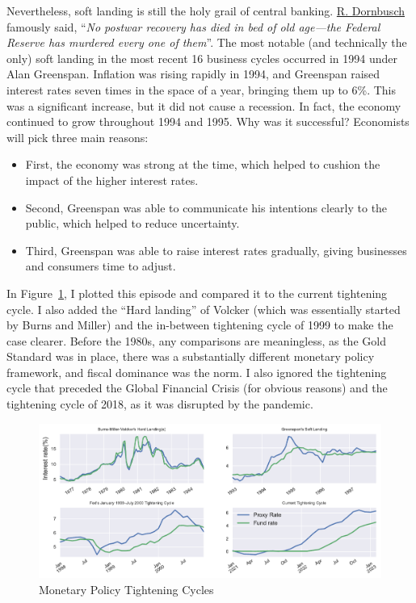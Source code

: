 \documentclass[
  letterpaper,
  DIV=11,
  numbers=noendperiod]{scrartcl}
\providecommand{\tightlist}{%
  \setlength{\itemsep}{0pt}\setlength{\parskip}{0pt}}\usepackage{longtable,booktabs,array}
\begin{document}
Nevertheless, soft landing is still the holy grail of central banking.
\href{https://en.wikipedia.org/wiki/Rudi_Dornbusch}{R. Dornbusch}
famously said, ``\emph{No postwar recovery has died in bed of old
age---the Federal Reserve has murdered every one of them}''. The most
notable (and technically the only) soft landing in the most recent 16
business cycles occurred in 1994 under Alan Greenspan. Inflation was
rising rapidly in 1994, and Greenspan raised interest rates seven times
in the space of a year, bringing them up to 6\%. This was a significant
increase, but it did not cause a recession. In fact, the economy
continued to grow throughout 1994 and 1995. Why was it successful?
Economists will pick three main reasons:

\begin{itemize}
\tightlist
\item
  First, the economy was strong at the time, which helped to cushion the
  impact of the higher interest rates.
\item
  Second, Greenspan was able to communicate his intentions clearly to
  the public, which helped to reduce uncertainty.
\item
  Third, Greenspan was able to raise interest rates gradually, giving
  businesses and consumers time to adjust.
\end{itemize}

In Figure~\ref{fig-5}, I plotted this episode and compared it to the
current tightening cycle. I also added the ``Hard landing'' of Volcker
(which was essentially started by Burns and Miller) and the in-between
tightening cycle of 1999 to make the case clearer. Before the 1980s, any
comparisons are meaningless, as the Gold Standard was in place, there
was a substantially different monetary policy framework, and fiscal
dominance was the norm. I also ignored the tightening cycle that
preceded the Global Financial Crisis (for obvious reasons) and the
tightening cycle of 2018, as it was disrupted by the pandemic.

\begin{figure}

{\centering \includegraphics{Hawkish_Fed_files/figure-pdf/fig-5-output-1.pdf}

}

\caption{\label{fig-5}Monetary Policy Tightening Cycles}

\end{figure}
\end{document}
